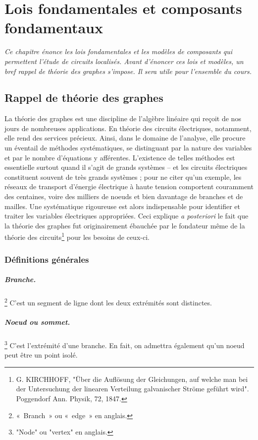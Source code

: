 
\chapter{Lois fondamentales et composants fondamentaux}
\label{fig:lois}

\textit{Ce chapitre énonce les lois fondamentales et les modèles de composants qui permettent l'étude de circuits localisés.
Avant d'énoncer ces lois et modèles, un bref rappel de théorie des graphes s'impose. Il sera utile pour l'ensemble du cours.
}
\section{Rappel de théorie des graphes}
La théorie des graphes est une discipline de l'algèbre linéaire qui reçoit de nos jours de nombreuses applications. En théorie des circuits électriques, notamment, elle rend des services précieux. Ainsi, dans le domaine de l'analyse, elle procure un éventail de méthodes systématiques, se distinguant par la nature des variables et par le nombre d'équations y afférentes. L'existence de telles méthodes est essentielle surtout quand il
s'agit de grands systèmes -- et les circuits électriques constituent souvent de très grands systèmes ; pour ne citer qu'un exemple, les réseaux de transport d'énergie électrique à haute tension comportent couramment des centaines, voire des milliers de noeuds et bien davantage de branches et de mailles. Une systématique rigoureuse est alors indispensable pour identifier et traiter les variables électriques appropriées. Ceci explique \textit{a posteriori} le fait que la théorie des graphes fut originairement ébauchée par le fondateur même de la théorie des circuits\footnote{G. KIRCHHOFF, "Über die Auflösung der Gleichungen, auf welche man bei der Untersuchung der linearen Verteilung galvanischer Ströme geführt wird". Poggendorf Ann. Physik, 72, 1847.} pour les besoins de ceux-ci.

\subsection{Définitions générales}
\paragraph{Branche.}\footnote{«~Branch~» ou «~edge~» en anglais.} C'est un segment de ligne dont les deux extrémités sont distinctes.

\paragraph{Noeud ou sommet.}\footnote{"Node" ou "vertex" en anglais.} C'est l'extrémité d'une branche.
En fait, on admettra également qu'un noeud peut être un point isolé.

